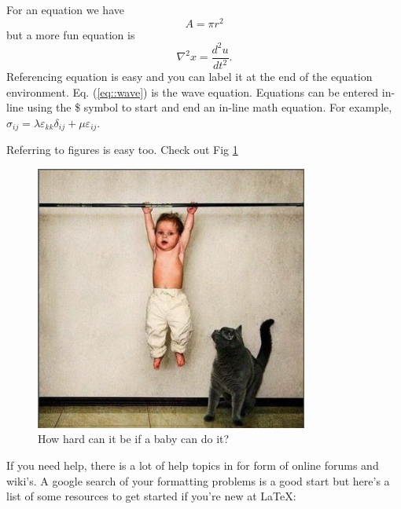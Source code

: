 For an equation we have 
\begin{equation}
	A = \pi r^2
\end{equation}
but a more fun equation is
\begin{equation}
	\nabla^2 x = \frac{d^2 u}{d t^2}.
    \label{eq::wave}
\end{equation}
Referencing equation is easy and you can label it at the end of the equation environment. Eq. (\ref{eq::wave}) is the wave equation. Equations can be entered in-line using the \$ symbol to start and end an in-line math equation. For example, $\sigma_{ij} = \lambda \varepsilon_{kk} \delta_{ij} + \mu \varepsilon_{ij} $. 


Referring to figures is easy too. Check out Fig \ref{fig::easy} 

\begin{figure}[!ht]
	\includegraphics[width=0.8\textwidth]{babydoingpullups}
    \caption{How hard can it be if a baby can do it?}
    \label{fig::easy}
\end{figure}




If you need help, there is a lot of help topics in for form of online forums and wiki's. A google search of your formatting problems is a good start but here's a list of some resources to get started if you're new at \LaTeX:

